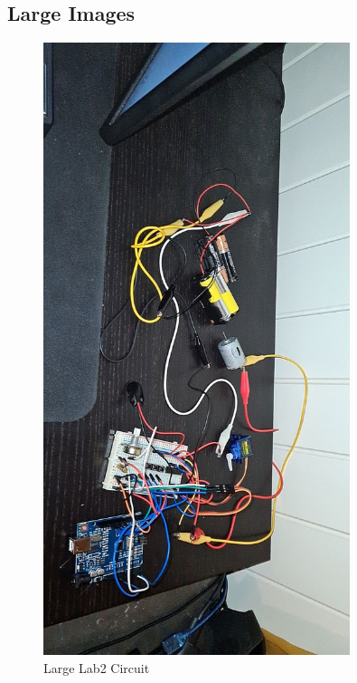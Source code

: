 \documentclass[journal]{IEEEtran}
\begin{document}
\begin{landscape}

    \section{Large Images}

    \begin{figure}[h]
        \begin {center}
        \includegraphics[width=0.8\textwidth, angle=90]{images/circuit-picture.jpg}
        \caption{Large Lab2 Circuit}
        \label{fig:circuitPictureLarge}
        \end {center}
    \end{figure}


\end{landscape}
\end{document}
